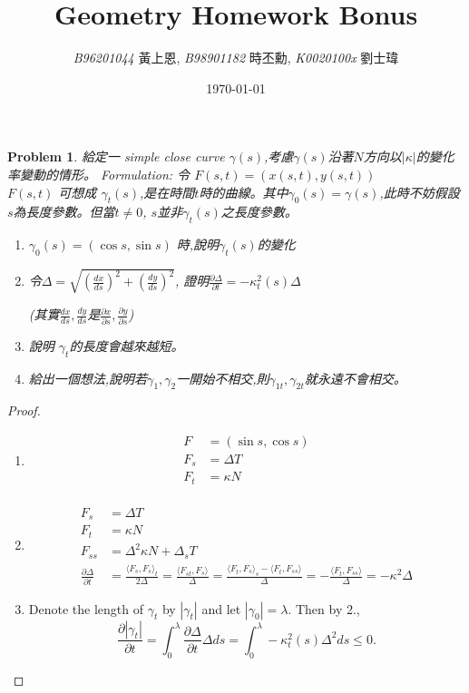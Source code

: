 \documentclass[10pt,a4paper]{article}
\newcommand{\LiHei}{\CJKfamily{lh}}
\newcounter{theProblemCounter}
\newtheorem{problem}[theProblemCounter]{Problem}
\begin{document}
\title{{Geometry Homework Bonus}}
\author{{\it{B96201044}} {\LiHei 黃上恩}, {\it{B98901182}} {\LiHei 時丕勳}, {\it{K0020100x}} {\LiHei 劉士瑋}}
\date{\today}
\maketitle

\newcommand{\bx}{\mathbb{X}}
\newcommand{\bfx}{\mathbf{x}}
\newcommand{\grad}{\textrm{grad }}
\newcommand{\sech}{\mbox{sech}}
\newcommand{\pr}[2]{\frac{\partial #1}{\partial #2}}
\newcommand{\prr}[3]{\frac{\partial^2 #1}{\partial #2\partial #3}}
\newcommand{\ip}[2]{\langle#1, #2\rangle}

\begin{problem}
給定一 simple close curve $\gamma(s)$,考慮$\gamma(s)$沿著$N$方向以$|\kappa|$的變化率變動的情形。 Formulation: 令 $F(s, t) = (x(s, t), y(s, t))$\\ $F(s,t)$ 可想成 $\gamma_t(s)$,是在時間$t$時的曲線。其中$\gamma_0(s) = \gamma(s)$,此時不妨假設$s$為長度參數。但當$t \neq 0$, $s$並非$\gamma_t(s)$之長度參數。\begin{enumerate}
\item $\gamma_0(s) = (\cos s, \sin s)$ 時,說明$\gamma_t(s)$的變化
\item 令$\Delta=\sqrt{\left(\frac{dx}{ds}\right)^2 + \left(\frac{dy}{ds}\right)^2}$, 證明$\frac{\partial\Delta}{\partial t}=-\kappa_t^2(s)\Delta$ \par
(其實$\frac{dx}{ds}, \frac{dy}{ds}$是$\frac{\partial x}{\partial s}, \frac{\partial y}{\partial s}$)
\item 說明 $\gamma_t$的長度會越來越短。
\item 給出一個想法,說明若$\gamma_1, \gamma_2$一開始不相交,則$\gamma_{1t}, \gamma_{2t}$就永遠不會相交。
\end{enumerate}
\end{problem}
\begin{proof}
\begin{enumerate}
\item 
\begin{align*}
F &= (\sin s, \cos s)\\
F_s &= \Delta T \\
F_t &= \kappa N \\
\end{align*}
\item 
\begin{align*}
F_s &= \Delta T \\
F_t &= \kappa N \\
F_{ss} &= \Delta^2\kappa N + \Delta_sT\\
\pr{\Delta}{t}&=\frac{\ip{F_s}{F_s}_t}{2\Delta}=\frac{\ip{F_{st}}{F_s}}{\Delta}=\frac{\ip{F_t}{F_s}_s-\ip{F_{t}}{F_{ss}}}{\Delta}=-\frac{\ip{F_t}{F_{ss}}}{\Delta}=-\kappa^2\Delta
\end{align*}
\item Denote the length of $\gamma_t$ by $|\gamma_t|$ and let $|\gamma_0|=\lambda$. Then by 2., $$\pr{|\gamma_t|}{t} =\int_0^{\lambda}\pr{\Delta}{t}\Delta ds = \int_0^{\lambda}-\kappa_t^2(s)\Delta^2 ds \leq 0.$$
\end{enumerate}
\end{proof}
\end{document}

